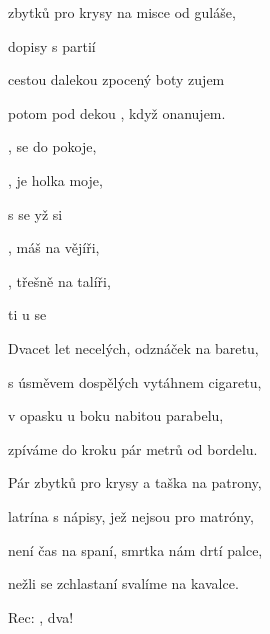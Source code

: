 

\zs
{} zbytků pro krysy na misce od guláše,

 dopisy s partií 

 cestou dalekou zpocený boty zujem

 potom pod dekou , když onanujem.
\ks

\zr
{},  se do pokoje,

,  je holka moje,

s  se yž  si 

,  máš na vějíři,

,  třešně na talíři,

 ti  u se 
\kr

\zs
Dvacet let necelých, odznáček na baretu,

s úsměvem dospělých vytáhnem cigaretu,

v opasku u boku nabitou parabelu,

zpíváme do kroku pár metrů od bordelu.
\ks

\zr  \kr

\zs
Pár zbytků pro krysy a taška na patrony,

latrína s nápisy, jež nejsou pro matróny,

není čas na spaní, smrtka nám drtí palce,

nežli se zchlastaní svalíme na kavalce.
\ks

\zr  \kr

Rec: , dva!

\zr  \kr

\kp






